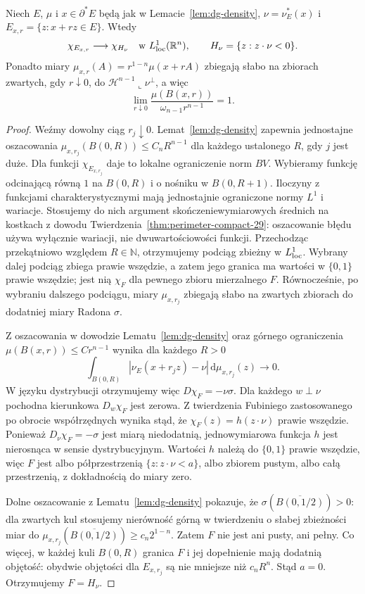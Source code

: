 \begin{lemat}
\label{lem:dg-blowup}
Niech $E$, $\mu$ i $x\in\partial^*E$ będą jak
w Lemacie~\ref{lem:dg-density}, $\nu=\nu_E^*(x)$
i $E_{x,r}=\{z:x+rz\in E\}$. Wtedy
\[
 \chi_{E_{x,r}}\longrightarrow\chi_{H_\nu}
 \quad\text{w }L^1_{\rm loc}(\mathbb R^n),\qquad
 H_\nu=\{z:z\cdot\nu<0\}.
\]
Ponadto miary $\mu_{x,r}(A)=r^{1-n}\mu(x+rA)$
zbiegają słabo na zbiorach zwartych, gdy
$r\downarrow0$, do
$\mathcal H^{n-1}\llcorner\nu^\perp$, a więc
\[
 \lim_{r\downarrow0}
 \frac{\mu(B(x,r))}{\omega_{n-1}r^{n-1}}=1.
\]
\end{lemat}
\begin{proof}
Weźmy dowolny ciąg $r_j\downarrow0$.
Lemat~\ref{lem:dg-density} zapewnia jednostajne
oszacowania $\mu_{x,r_j}(B(0,R))\le C_nR^{n-1}$
dla każdego ustalonego $R$, gdy $j$ jest duże.
Dla funkcji $\chi_{E_{x,r_j}}$ daje to lokalne
ograniczenie norm $BV$. Wybieramy funkcję
odcinającą równą $1$ na $B(0,R)$ i o nośniku
w $B(0,R+1)$. Iloczyny z funkcjami
charakterystycznymi mają jednostajnie
ograniczone normy $L^1$ i wariacje.
Stosujemy do nich argument skończeniewymiarowych
średnich na kostkach z dowodu
Twierdzenia~\ref{thm:perimeter-compact-29}:
oszacowanie błędu używa wyłącznie wariacji,
nie dwuwartościowości funkcji. Przechodząc
przekątniowo względem $R\in\mathbb N$,
otrzymujemy podciąg zbieżny w $L^1_{\rm loc}$.
Wybrany dalej podciąg zbiega prawie wszędzie,
a zatem jego granica ma wartości w $\{0,1\}$
prawie wszędzie; jest nią $\chi_F$ dla pewnego
zbioru mierzalnego $F$.
Równocześnie, po wybraniu dalszego podciągu,
miary $\mu_{x,r_j}$ zbiegają słabo na zwartych
zbiorach do dodatniej miary Radona $\sigma$.

Z oszacowania w dowodzie Lematu~\ref{lem:dg-density}
oraz górnego ograniczenia $\mu(B(x,r))\le Cr^{n-1}$
wynika dla każdego $R>0$
\[
 \int_{B(0,R)}|\nu_E(x+r_jz)-\nu|\,
 \mathrm d\mu_{x,r_j}(z)\longrightarrow0.
\]
W języku dystrybucji otrzymujemy więc
$D\chi_F=-\nu\sigma$. Dla każdego $w\perp\nu$
pochodna kierunkowa $D_w\chi_F$ jest zerowa.
Z twierdzenia Fubiniego zastosowanego po obrocie
współrzędnych wynika stąd, że
$\chi_F(z)=h(z\cdot\nu)$ prawie wszędzie.
Ponieważ $D_\nu\chi_F=-\sigma$ jest miarą
niedodatnią, jednowymiarowa funkcja $h$ jest
nierosnąca w sensie dystrybucyjnym.
Wartości $h$ należą do $\{0,1\}$ prawie wszędzie,
więc $F$ jest albo półprzestrzenią
$\{z:z\cdot\nu<a\}$, albo zbiorem pustym,
albo całą przestrzenią, z dokładnością do miary zero.

Dolne oszacowanie z Lematu~\ref{lem:dg-density}
pokazuje, że $\sigma(\overline{B(0,1/2)})>0$:
dla zwartych kul stosujemy nierówność górną
w twierdzeniu o słabej zbieżności miar do
$\mu_{x,r_j}(\overline{B(0,1/2)})\ge c_n2^{1-n}$.
Zatem $F$ nie jest ani pusty, ani pełny.
Co więcej, w każdej kuli $B(0,R)$ granica $F$
i jej dopełnienie mają dodatnią objętość:
obydwie objętości dla $E_{x,r_j}$ są
nie mniejsze niż $c_nR^n$. Stąd $a=0$.
Otrzymujemy $F=H_\nu$.


\end{proof}
